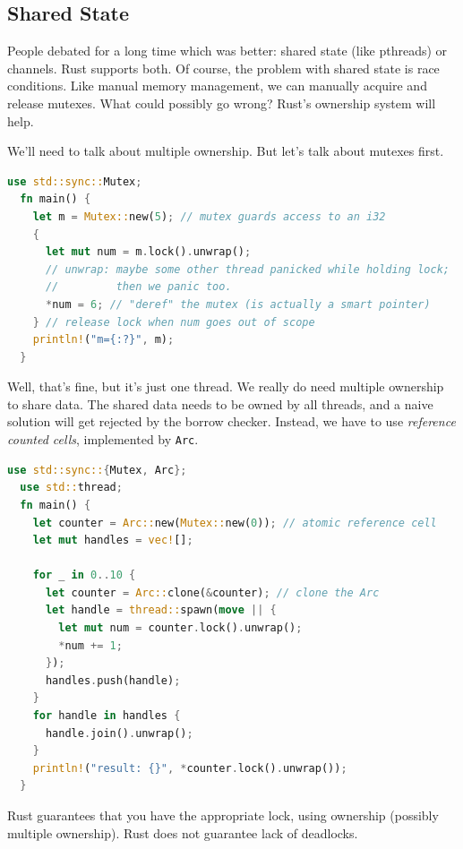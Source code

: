 \documentclass[a4paper]{report}
\begin{document}
\subsection*{Shared State}
People debated for a long time which was better: shared state (like pthreads) or channels.
Rust supports both. Of course, the problem with shared state is race conditions.
Like manual memory management, we can manually acquire and release mutexes. What could
possibly go wrong? Rust's ownership system will help.

We'll need to talk about multiple ownership. But let's talk about mutexes first.
\begin{lstlisting}[language=Rust]
  use std::sync::Mutex;
  fn main() {
    let m = Mutex::new(5); // mutex guards access to an i32
    {
      let mut num = m.lock().unwrap();
      // unwrap: maybe some other thread panicked while holding lock;
      //         then we panic too.
      *num = 6; // "deref" the mutex (is actually a smart pointer)
    } // release lock when num goes out of scope
    println!("m={:?}", m);
  }
\end{lstlisting}
Well, that's fine, but it's just one thread. We really do need multiple ownership
to share data. The shared data needs to be owned by all threads, and a naive solution
will get rejected by the borrow checker. Instead, we have to use \emph{reference counted
  cells}, implemented by {\tt Arc}.
\begin{lstlisting}[language=Rust]
  use std::sync::{Mutex, Arc};
  use std::thread;
  fn main() {
    let counter = Arc::new(Mutex::new(0)); // atomic reference cell
    let mut handles = vec![];

    for _ in 0..10 {
      let counter = Arc::clone(&counter); // clone the Arc
      let handle = thread::spawn(move || {
        let mut num = counter.lock().unwrap();
        *num += 1;
      });
      handles.push(handle);
    }
    for handle in handles {
      handle.join().unwrap();
    }
    println!("result: {}", *counter.lock().unwrap());
  }
\end{lstlisting}
Rust guarantees that you have the appropriate lock, using ownership (possibly multiple ownership).
Rust does not guarantee lack of deadlocks.






\end{document}
